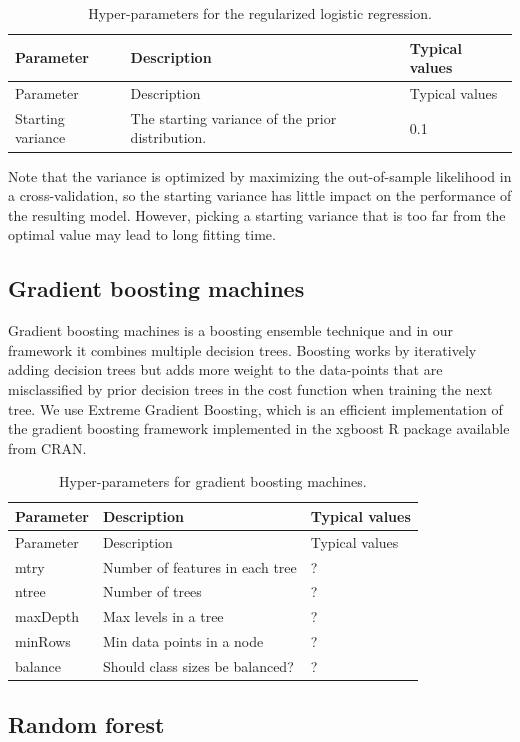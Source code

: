 \documentclass[11pt]{book}
\theoremstyle{definition}
\theoremstyle{definition}
\theoremstyle{definition}
\theoremstyle{remark}
\begin{document}
\begin{longtable}[]{@{}lll@{}}
\caption{\label{tab:lassoParameters} Hyper-parameters for the regularized logistic regression.}\tabularnewline
\toprule
Parameter & Description & Typical values\tabularnewline
\midrule
\endfirsthead
\toprule
Parameter & Description & Typical values\tabularnewline
\midrule
\endhead
Starting variance & The starting variance of the prior distribution. & 0.1\tabularnewline
\bottomrule
\end{longtable}

Note that the variance is optimized by maximizing the out-of-sample likelihood in a cross-validation, so the starting variance has little impact on the performance of the resulting model. However, picking a starting variance that is too far from the optimal value may lead to long fitting time.   

\hypertarget{gradient-boosting-machines}{%
\subsection{Gradient boosting machines}\label{gradient-boosting-machines}}

Gradient boosting machines is a boosting ensemble technique and in our framework it combines multiple decision trees. Boosting works by iteratively adding decision trees but adds more weight to the data-points that are misclassified by prior decision trees in the cost function when training the next tree. We use Extreme Gradient Boosting, which is an efficient implementation of the gradient boosting framework implemented in the xgboost R package available from CRAN.  

\begin{longtable}[]{@{}lll@{}}
\caption{\label{tab:gbmParameters} Hyper-parameters for gradient boosting machines.}\tabularnewline
\toprule
Parameter & Description & Typical values\tabularnewline
\midrule
\endfirsthead
\toprule
Parameter & Description & Typical values\tabularnewline
\midrule
\endhead
mtry & Number of features in each tree & ?\tabularnewline
ntree & Number of trees & ?\tabularnewline
maxDepth & Max levels in a tree & ?\tabularnewline
minRows & Min data points in a node & ?\tabularnewline
balance & Should class sizes be balanced? & ?\tabularnewline
\bottomrule
\end{longtable}

\hypertarget{random-forest}{%
\subsection{Random forest}\label{random-forest}}
\end{document}
